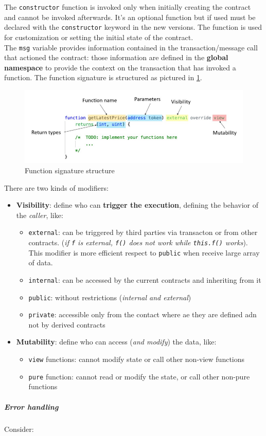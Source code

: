 \documentclass[10pt,a4paper]{report}
\begin{document}
The  \texttt{constructor} function is invoked only when initially creating the contract and cannot be invoked afterwards. It's an optional function but if used must be declared with the \texttt{constructor} keyword in the new versions. The function is used for customization or setting the initial state of the contract.\\
The \texttt{msg} variable provides information contained in the transaction/message call that actioned the contract: those information are defined in the \textbf{global namespace} to provide the context on the transaction that has invoked a function.
The function signature is structured as pictured in \ref{func-sign}.
	\begin{figure}[h]
		\centering
		\includegraphics[scale=0.50]{images/Pasted image 20230424104409.png}
		\caption{Function signature structure}
		\label{func-sign}
	\end{figure}
	
There are two kinds of modifiers:
\begin{itemize}
		\item 
		\textbf{Visibility}: define who can \textbf{trigger the execution}, defining the behavior of the \textit{caller}, like:
		\begin{itemize}
			\item 
			\texttt{external}: can be triggered by third parties via transacton or from other contracts. (\textit{if \texttt{f} is external, \texttt{f()}  does not work while \texttt{this.f()} works}). This modifier is more efficient respect to \texttt{public} when receive large array of data.
			\item 
			\texttt{internal}: can be accessed by the current contracts and inheriting from it
			\item 
			\texttt{public}: without restrictions (\textit{internal and external})
			\item 
			\texttt{private}: accessible only from the contact where ae they are defined adn not by derived contracts
		\end{itemize}
		\item 
		\textbf{Mutability}: define who can access (\textit{and modify}) the data, like:
		\begin{itemize}
			\item 
			\texttt{view} functions: cannot modify state or call other non-view functions
			\item 
			\texttt{pure} function: cannot read or modify the state, or call other non-pure functions
		\end{itemize}
	\end{itemize}
	\subparagraph{Error handling}\label{sec:error-handling}
	Consider:
\end{document}
